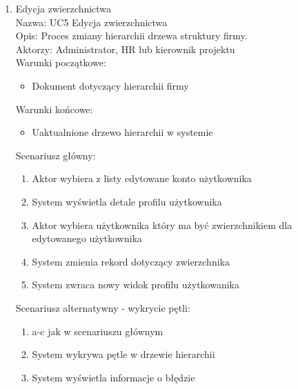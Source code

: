 \begin{enumerate}
\item Edycja zwierzchnictwa \\
Nazwa: UC5 Edycja zwierzchnictwa \\
Opis: Proces zmiany hierarchii drzewa struktury firmy. \\
Aktorzy: Administrator, HR lub kierownik projektu \\
Warunki początkowe:
\begin{itemize}
\item Dokument dotyczący hierarchii firmy
\end{itemize}
Warunki końcowe:
\begin{itemize}
\item Uaktualnione drzewo hierarchii w systemie 
\end{itemize}
Scenariusz główny:
\begin{enumerate}
\item Aktor wybiera z listy edytowane konto użytkownika
\item System wyświetla detale profilu użytkownika
\item Aktor wybiera użytkownika który ma być zwierzchnikiem dla edytowanego użytkownika
\item System zmienia rekord dotyczący zwierzchnika
\item System zwraca nowy widok profilu użytkowanika
\end{enumerate}
Scenariusz alternatywny - wykrycie pętli: 
\begin{enumerate}
\item a-c jak w scenariuszu głównym
\item System wykrywa pętle w drzewie hierarchii
\item System wyświetla informacje o błędzie
\end{enumerate}


\end{enumerate}
